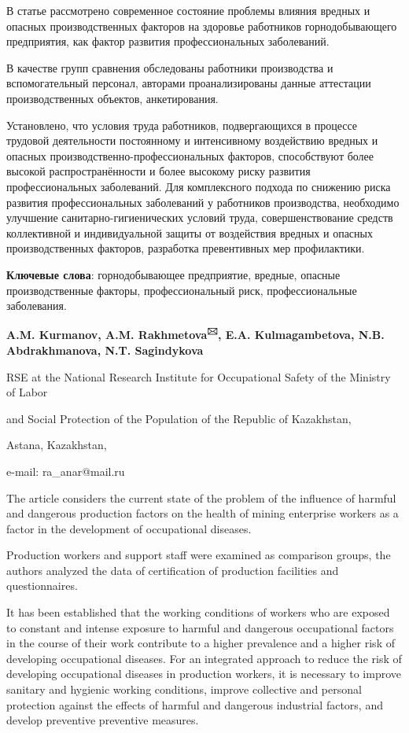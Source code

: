 В статье рассмотрено современное состояние проблемы влияния вредных и
опасных производственных факторов на здоровье работников
горнодобывающего предприятия, как фактор развития профессиональных
заболеваний.

В качестве групп сравнения обследованы работники производства и
вспомогательный персонал, авторами проанализированы данные аттестации
производственных объектов, анкетирования.

Установлено, что условия труда работников, подвергающихся в процессе
трудовой деятельности постоянному и интенсивному воздействию вредных и
опасных производственно-профессиональных факторов, способствуют более
высокой распространённости и более высокому риску развития
профессиональных заболеваний. Для комплексного подхода по снижению риска
развития профессиональных заболеваний у работников производства,
необходимо улучшение санитарно-гигиенических условий труда,
совершенствование средств коллективной и индивидуальной защиты от
воздействия вредных и опасных производственных факторов, разработка
превентивных мер профилактики.

{\bfseries Ключевые слова}: горнодобывающее предприятие, вредные, опасные
производственные факторы, профессиональный риск, профессиональные
заболевания.


\begin{center}
{\bfseries A.M. Kurmanov, A.M. Rakhmetova\textsuperscript{🖂}, E.A. Kulmagambetova, N.B. Abdrakhmanova, N.T. Sagindykova}

RSE at the National Research Institute for Occupational Safety of the
Ministry of Labor

and Social Protection of the Population of the Republic of Kazakhstan,

Astana, Kazakhstan,

e-mail: ra\_anar@mail.ru
\end{center}

The article considers the current state of the problem of the influence
of harmful and dangerous production factors on the health of mining
enterprise workers as a factor in the development of occupational
diseases.

Production workers and support staff were examined as comparison groups,
the authors analyzed the data of certification of production facilities
and questionnaires.

It has been established that the working conditions of workers who are
exposed to constant and intense exposure to harmful and dangerous
occupational factors in the course of their work contribute to a higher
prevalence and a higher risk of developing occupational diseases. For an
integrated approach to reduce the risk of developing occupational
diseases in production workers, it is necessary to improve sanitary and
hygienic working conditions, improve collective and personal protection
against the effects of harmful and dangerous industrial factors, and
develop preventive preventive measures.


